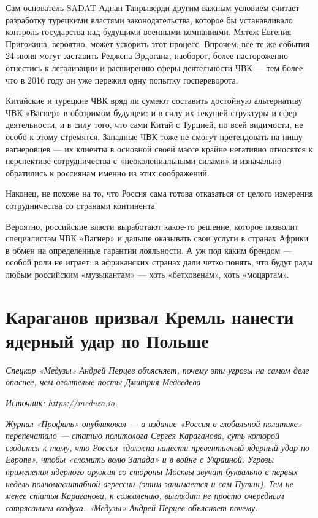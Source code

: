 Сам основатель SADAT Аднан Танрыверди другим важным условием считает разработку турецкими властями законодательства, которое бы устанавливало контроль государства над будущими военными компаниями. Мятеж Евгения Пригожина, вероятно, может ускорить этот процесс. Впрочем, все те же события 24 июня могут заставить Реджепа Эрдогана, наоборот, более настороженно отнестись к легализации и расширению сферы деятельности ЧВК — тем более что в 2016 году он уже пережил одну попытку госпереворота.

Китайские и турецкие ЧВК вряд ли сумеют составить достойную альтернативу ЧВК «Вагнер» в обозримом будущем: и в силу их текущей структуры и сфер деятельности, и в силу того, что сами Китай с Турцией, по всей видимости, не особо к этому стремятся. Западные ЧВК тоже не смогут претендовать на нишу вагнеровцев — их клиенты в основной своей массе крайне негативно относятся к перспективе сотрудничества с «неоколониальными силами» и изначально обратились к россиянам именно из этих соображений.

\begin{center}
    \Large
    Наконец, не похоже на то, что Россия сама готова отказаться от целого измерения сотрудничества со странами континента
\end{center}

Вероятно, российские власти выработают какое-то решение, которое позволит специалистам ЧВК «Вагнер» и дальше оказывать свои услуги в странах Африки в обмен на определенные гарантии лояльности. А уж под каким брендом — особой роли не играет: в африканских странах дали четко понять, что будут рады любым российским «музыкантам» — хоть «бетховенам», хоть «моцартам».

\newpage
\section{Караганов призвал Кремль нанести ядерный удар по Польше}

\textit{Спецкор «Медузы» Андрей Перцев объясняет, почему эти угрозы на самом деле опаснее, чем оголтелые посты Дмитрия Медведева}

\textit{Источник: \url{https://meduza.io}}

\textit{Журнал «Профиль» опубликовал — а издание «Россия в глобальной политике» перепечатало — статью политолога Сергея Караганова, суть которой сводится к тому, что Россия «должна нанести превентивный ядерный удар по Европе», чтобы «сломить волю Запада» и  в войне с Украиной. Угрозы применения ядерного оружия со стороны Москвы звучат буквально с первых недель полномасштабной агрессии (этим занимается и сам Путин). Тем не менее статья Караганова, к сожалению, выглядит не просто очередным сотрясанием воздуха.  «Медузы» Андрей Перцев объясняет почему.
}

